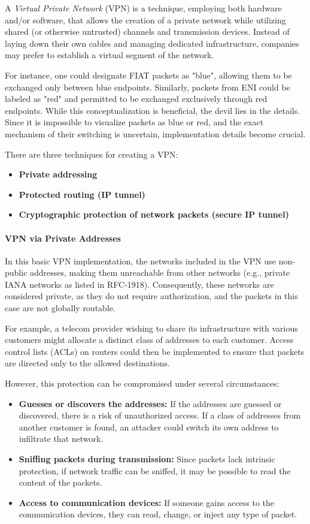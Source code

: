 A \textit{Virtual Private Network} (VPN) is a technique, employing both hardware and/or software, that allows the creation of a private network while utilizing shared (or otherwise untrusted) channels and transmission devices. Instead of laying down their own cables and managing dedicated infrastructure, companies may prefer to establish a virtual segment of the network.

For instance, one could designate FIAT packets as "blue", allowing them to be exchanged only between blue endpoints. Similarly, packets from ENI could be labeled as "red" and permitted to be exchanged exclusively through red endpoints. While this conceptualization is beneficial, the devil lies in the details. Since it is impossible to visualize packets as blue or red, and the exact mechanism of their switching is uncertain, implementation details become crucial.

There are three techniques for creating a VPN:
\begin{itemize}
    \item \textbf{Private addressing}
    \item \textbf{Protected routing (IP tunnel)}
    \item \textbf{Cryptographic protection of network packets (secure IP tunnel)}
\end{itemize}


\paragraph*{VPN via Private Addresses}

In this basic VPN implementation, the networks included in the VPN use non-public addresses, making them unreachable from other networks (e.g., private IANA networks as listed in RFC-1918). Consequently, these networks are considered private, as they do not require authorization, and the packets in this case are not globally routable.

For example, a telecom provider wishing to share its infrastructure with various customers might allocate a distinct class of addresses to each customer. Access control lists (ACLs) on routers could then be implemented to ensure that packets are directed only to the allowed destinations.

However, this protection can be compromised under several circumstances:
\begin{itemize}
    \item \textbf{Guesses or discovers the addresses:} If the addresses are guessed or discovered, there is a risk of unauthorized access. If a class of addresses from another customer is found, an attacker could switch its own address to infiltrate that network.
    \item \textbf{Sniffing packets during transmission:} Since packets lack intrinsic protection, if network traffic can be sniffed, it may be possible to read the content of the packets.
    \item \textbf{Access to communication devices:} If someone gains access to the communication devices, they can read, change, or inject any type of packet.
\end{itemize}

